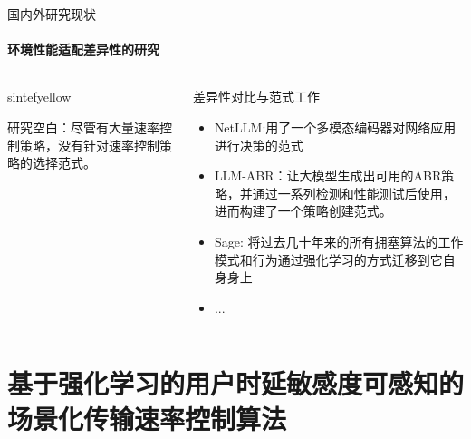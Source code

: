 \documentclass{beamer}
\begin{document}
\begin{frame}[fragile]{国内外研究现状}
\framesubtitle{环境性能适配差异性的研究}
        \begin{columns}
        \begin{column}{0.58\textwidth}
            \begin{colorblock}[black]{sintefyellow}{}
            
            \end{colorblock}
                    \alert{研究空白：尽管有大量速率控制策略，没有针对速率控制策略的选择范式。}
        \end{column}
    
        \begin{column}{0.44\textwidth}        \begin{block}{差异性对比与范式工作}
            \begin{itemize}
                \item NetLLM\cite{wu2024netllm}:用了一个多模态编码器对网络应用进行决策的范式

                \item LLM-ABR\cite{he2024llm}：让大模型生成出可用的ABR策略，并通过一系列检测和性能测试后使用，进而构建了一个策略创建范式。
                \item Sage\cite{yen2023computers}: 将过去几十年来的所有拥塞算法的工作模式和行为通过强化学习的方式迁移到它自身身上
                \item ...
            \end{itemize}

        \end{block}

        \end{column}
    \end{columns}
\end{frame}

\section{基于强化学习的用户时延敏感度可感知的场景化传输速率控制算法}
\end{document}
